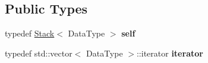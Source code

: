 \subsection*{Public Types}
\begin{DoxyCompactItemize}
\item 
\mbox{\label{classez_1_1objects_1_1Stack_a906d00cfa314ec73d3d0d55ab65876d5}} 
typedef \hyperlink{classez_1_1objects_1_1Stack}{Stack}$<$ Data\+Type $>$ {\bfseries self}
\item 
\mbox{\label{classez_1_1objects_1_1Stack_ac5007b3065c1b9dd8907d20a32437f27}} 
typedef std\+::vector$<$ Data\+Type $>$\+::iterator {\bfseries iterator}
\end{DoxyCompactItemize}
